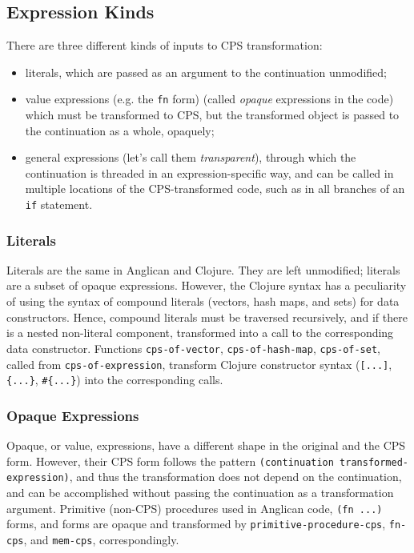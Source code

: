 \documentclass[preprint]{sigplanconf}
\begin{document}
\subsection{Expression Kinds}

There are three different kinds of inputs to CPS transformation:
\begin{itemize}
    \item literals, which are passed as an argument to the
        continuation unmodified;
    \item value expressions (e.g. the \texttt{fn} form) 
        (called \textit{opaque}
        expressions in the code) which must be transformed to
        CPS, but the transformed object is passed to the
        continuation as a whole, opaquely;
    \item general expressions (let's call them
        \textit{transparent}), through which the continuation is
        threaded in an expression-specific way, and can be
        called in multiple locations of the CPS-transformed
        code, such as in all branches of an \texttt{if}
        statement.
\end{itemize}

\subsubsection{Literals}

Literals are the same in Anglican and Clojure. They are 
left unmodified; literals are a subset of opaque expressions.
However, the Clojure syntax has a peculiarity
of using the syntax of compound literals (vectors, hash maps,
and sets) for data constructors. Hence, compound literals must
be traversed recursively, and if there is a nested non-literal
component, transformed into a call to the corresponding data
constructor. Functions \texttt{cps-of-vector},
\texttt{cps-of-hash-map}, \texttt{cps-of-set}, called from
\texttt{cps-of-expression}, transform Clojure constructor syntax
(\texttt{[...]}, \texttt{\{...\}}, \texttt{\#\{...\}}) into the
corresponding calls.

\subsubsection{Opaque Expressions}

Opaque, or value, expressions, have a different shape in the
original and the CPS form. However, their CPS form follows the
pattern \texttt{(continuation transformed-expression)}, and thus
the transformation does not depend on the continuation, and
can be accomplished without passing the continuation as a
transformation argument. Primitive (non-CPS) procedures used in
Anglican code, \texttt{(fn ...)} forms, and 
forms are opaque and transformed by
\texttt{primitive-}\linebreak[0]\texttt{procedure-}\linebreak[0]\texttt{cps},
\texttt{fn-cps}, and \texttt{mem-cps}, correspondingly.
\end{document}
